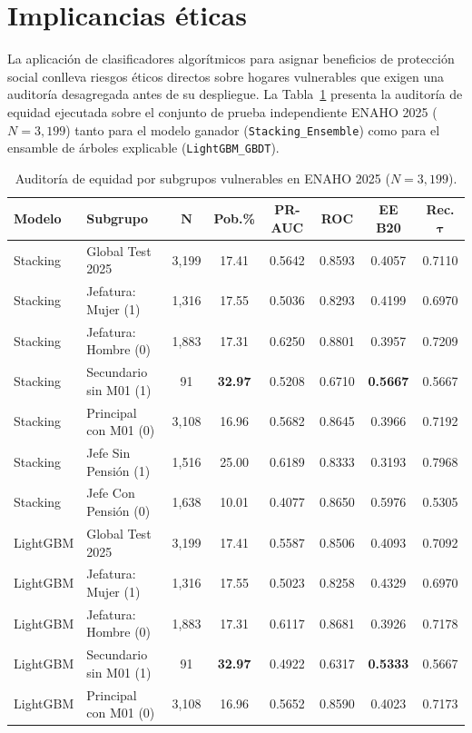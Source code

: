 \section{Implicancias éticas}

La aplicación de clasificadores algorítmicos para asignar beneficios de protección social conlleva riesgos éticos directos sobre hogares vulnerables que exigen una auditoría desagregada antes de su despliegue. La Tabla~\ref{tab:equidad_subgrupos} presenta la auditoría de equidad ejecutada sobre el conjunto de prueba independiente ENAHO 2025 ($N=3{,}199$) tanto para el modelo ganador (\texttt{Stacking\_Ensemble}) como para el ensamble de árboles explicable (\texttt{LightGBM\_GBDT}).

\begin{table}[htbp]
\centering
\caption{Auditoría de equidad por subgrupos vulnerables en ENAHO 2025 ($N=3{,}199$).}
\label{tab:equidad_subgrupos}
\fontsize{6.0}{7.4}\selectfont
\setlength{\tabcolsep}{1.7pt}
\begin{tabular}{llcccccc}
\toprule
\textbf{Modelo} & \textbf{Subgrupo} & $\boldsymbol{N}$ & \textbf{Pob.\%} & \textbf{PR-AUC} & \textbf{ROC} & \textbf{EE B20} & \textbf{Rec. $\boldsymbol{\tau}$} \\
\midrule
Stacking & Global Test 2025 & 3,199 & 17.41 & 0.5642 & 0.8593 & 0.4057 & 0.7110 \\
Stacking & Jefatura: Mujer (1) & 1,316 & 17.55 & 0.5036 & 0.8293 & 0.4199 & 0.6970 \\
Stacking & Jefatura: Hombre (0) & 1,883 & 17.31 & 0.6250 & 0.8801 & 0.3957 & 0.7209 \\
Stacking & Secundario sin M01 (1) & 91 & \textbf{32.97} & 0.5208 & 0.6710 & \textbf{0.5667} & 0.5667 \\
Stacking & Principal con M01 (0) & 3,108 & 16.96 & 0.5682 & 0.8645 & 0.3966 & 0.7192 \\
Stacking & Jefe Sin Pensión (1) & 1,516 & 25.00 & 0.6189 & 0.8333 & 0.3193 & 0.7968 \\
Stacking & Jefe Con Pensión (0) & 1,638 & 10.01 & 0.4077 & 0.8650 & 0.5976 & 0.5305 \\
\midrule
LightGBM & Global Test 2025 & 3,199 & 17.41 & 0.5587 & 0.8506 & 0.4093 & 0.7092 \\
LightGBM & Jefatura: Mujer (1) & 1,316 & 17.55 & 0.5023 & 0.8258 & 0.4329 & 0.6970 \\
LightGBM & Jefatura: Hombre (0) & 1,883 & 17.31 & 0.6117 & 0.8681 & 0.3926 & 0.7178 \\
LightGBM & Secundario sin M01 (1) & 91 & \textbf{32.97} & 0.4922 & 0.6317 & \textbf{0.5333} & 0.5667 \\
LightGBM & Principal con M01 (0) & 3,108 & 16.96 & 0.5652 & 0.8590 & 0.4023 & 0.7173 \\
\bottomrule
\end{tabular}
\end{table}

